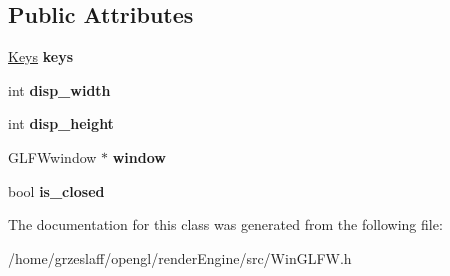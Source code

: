 \subsection*{Public Attributes}
\begin{DoxyCompactItemize}
\item 
\hypertarget{classWinGLFW_a883ffec068fd11413e107d63a7fb702e}{\hyperlink{classKeys}{Keys} {\bfseries keys}}\label{classWinGLFW_a883ffec068fd11413e107d63a7fb702e}

\item 
\hypertarget{classWinGLFW_ae3d0e8289cc99eb03d57a0d2fa5ec08e}{int {\bfseries disp\-\_\-width}}\label{classWinGLFW_ae3d0e8289cc99eb03d57a0d2fa5ec08e}

\item 
\hypertarget{classWinGLFW_a3796600413f07891d5cb975edeffab59}{int {\bfseries disp\-\_\-height}}\label{classWinGLFW_a3796600413f07891d5cb975edeffab59}

\item 
\hypertarget{classWinGLFW_a0ef9f587dc9e1955439761b3684049e7}{G\-L\-F\-Wwindow $\ast$ {\bfseries window}}\label{classWinGLFW_a0ef9f587dc9e1955439761b3684049e7}

\item 
\hypertarget{classWinGLFW_a27acf373affe8411e8bf1eedec27595d}{bool {\bfseries is\-\_\-closed}}\label{classWinGLFW_a27acf373affe8411e8bf1eedec27595d}

\end{DoxyCompactItemize}


The documentation for this class was generated from the following file\-:\begin{DoxyCompactItemize}
\item 
/home/grzeslaff/opengl/render\-Engine/src/Win\-G\-L\-F\-W.\-h\end{DoxyCompactItemize}
